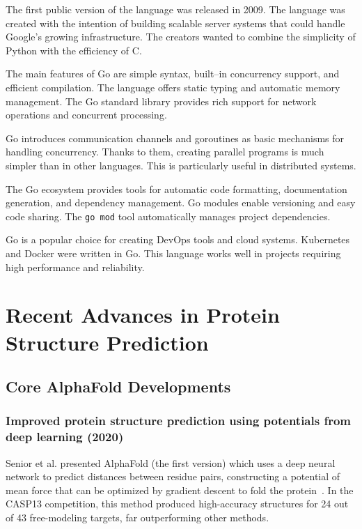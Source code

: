 The first public version of the language was released in 2009.
The language was created with the intention of building scalable server systems that could handle Google's growing infrastructure.
The creators wanted to combine the simplicity of Python with the efficiency of C\@.

The main features of Go are simple syntax, built--in concurrency support, and efficient compilation.
The language offers static typing and automatic memory management.
The Go standard library provides rich support for network operations and concurrent processing.

Go introduces communication channels and goroutines as basic mechanisms for handling concurrency.
Thanks to them, creating parallel programs is much simpler than in other languages.
This is particularly useful in distributed systems.

The Go ecosystem provides tools for automatic code formatting, documentation generation, and dependency management.
Go modules enable versioning and easy code sharing.
The \texttt{go mod} tool automatically manages project dependencies.

Go is a popular choice for creating DevOps tools and cloud systems.
Kubernetes and Docker were written in Go. This language works well in projects requiring high performance and reliability.


\section{Recent Advances in Protein Structure Prediction}

\subsection{Core AlphaFold Developments}

\subsubsection{Improved protein structure prediction using potentials from deep learning (2020)}

Senior et al.
presented AlphaFold (the first version) which uses a deep neural network to predict distances between residue pairs, constructing a potential of mean force that can be optimized by gradient descent to fold the protein~\cite{Senior2020AlphaFold}.
In the CASP13 competition, this method produced high-accuracy structures for 24 out of 43 free-modeling targets, far outperforming other methods.

